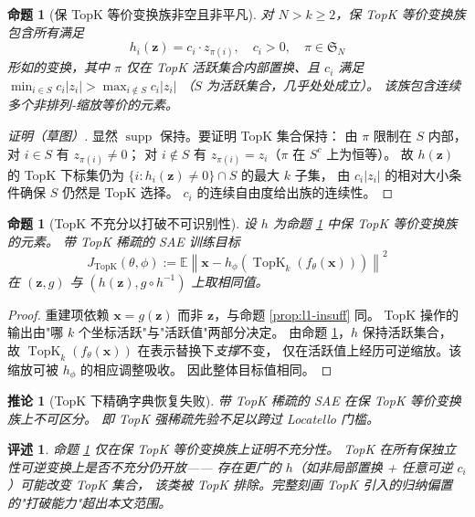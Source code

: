 \documentclass[11pt,a4paper]{article}
\newtheorem{proposition}[theorem]{命题}
\newtheorem{corollary}[theorem]{推论}
\newtheorem{remark}[theorem]{评述}
\theoremstyle{remark}
\DeclareMathOperator{\supp}{supp}
\DeclareMathOperator{\TopK}{TopK}
\newcommand{\Z}{\bm{z}}
\newcommand{\X}{\bm{x}}
\newcommand{\norm}[1]{\left\lVert#1\right\rVert}
\begin{document}
\begin{proposition}[保 TopK 等价变换族非空且非平凡]\label{prop:topk-family}
对 $N > k \geq 2$，保 TopK 等价变换族包含所有满足
\[
h_i(\Z) = c_i \cdot z_{\pi(i)}, \quad c_i > 0, \quad \pi \in \mathfrak{S}_N
\]
形如的变换，其中 $\pi$ 仅在 TopK 活跃集合内部置换、且 $c_i$ 满足
$\min_{i \in S} c_i |z_i| > \max_{i \notin S} c_i |z_i|$
（$S$ 为活跃集合，几乎处处成立）。
该族包含连续多个非排列-缩放等价的元素。
\end{proposition}

\begin{proof}[证明（草图）]
显然 $\supp$ 保持。要证明 TopK 集合保持：
由 $\pi$ 限制在 $S$ 内部，对 $i \in S$ 有 $z_{\pi(i)} \neq 0$；
对 $i \notin S$ 有 $z_{\pi(i)} = z_i$（$\pi$ 在 $S^c$ 上为恒等）。
故 $h(\Z)$ 的 TopK 下标集仍为 $\{i : h_i(\Z) \neq 0\} \cap S$ 的最大 $k$ 子集，
由 $c_i |z_i|$ 的相对大小条件确保 $S$ 仍然是 TopK 选择。
$c_i$ 的连续自由度给出族的连续性。
\end{proof}

\begin{proposition}[TopK 不充分以打破不可识别性]\label{prop:topk-insuff}
设 $h$ 为命题 \ref{prop:topk-family} 中保 TopK 等价变换族的元素。
带 TopK 稀疏的 SAE 训练目标
\[
J_{\TopK}(\theta,\phi) := \mathbb{E}\norm{\X - h_\phi(\TopK_k(f_\theta(\X)))}^2
\]
在 $(\Z, g)$ 与 $(h(\Z), g \circ h^{-1})$ 上取相同值。
\end{proposition}

\begin{proof}
重建项依赖 $\X = g(\Z)$ 而非 $\Z$，与命题 \ref{prop:l1-insuff} 同。
TopK 操作的输出由"哪 $k$ 个坐标活跃"与"活跃值"两部分决定。
由命题 \ref{prop:topk-family}，$h$ 保持活跃集合，
故 $\TopK_k(f_\theta(\X))$ 在表示替换下\emph{支撑}不变，
仅在活跃值上经历可逆缩放。该缩放可被 $h_\phi$ 的相应调整吸收。
因此整体目标值相同。
\end{proof}

\begin{corollary}[TopK 下精确字典恢复失败]\label{cor:topk-fail}
带 TopK 稀疏的 SAE 在保 TopK 等价变换族上不可区分。
即 TopK 强稀疏先验不足以跨过 Locatello 门槛。
\end{corollary}

\begin{remark}\label{rem:topk-open}
命题 \ref{prop:topk-insuff} 仅在保 TopK 等价变换族上证明不充分性。
TopK 在\emph{所有}保独立性可逆变换上是否不充分仍开放——
存在更广的 $h$（如非局部置换 + 任意可逆 $c_i$）可能改变 TopK 集合，
该类被 TopK 排除。完整刻画 TopK 引入的归纳偏置的"打破能力"超出本文范围。
\end{remark}
\end{document}
